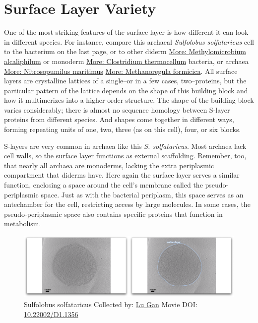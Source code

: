 \documentclass[]{tufte-book}
\begin{document}
\section{Surface Layer Variety}\label{surface-layer-variety}

One of the most striking features of the surface layer is how different
it can look in different species. For instance, compare this archaeal
\emph{Sulfolobus solfataricus} cell to the bacterium on the last page,
or to other diderm
\protect\hyperlink{Methylomicrobium_alcaliphilum}{More: Methylomicrobium
alcaliphilum} or monoderm
\protect\hyperlink{Clostridium_thermocellum}{More: Clostridium
thermocellum} bacteria, or archaea
\protect\hyperlink{Nitrosopumilus_maritimus}{More: Nitrosopumilus
maritimus} \protect\hyperlink{Methanoregula_formicica}{More:
Methanoregula formicica}. All surface layers are crystalline lattices of
a single--or in a few cases, two--proteins, but the particular pattern
of the lattice depends on the shape of this building block and how it
multimerizes into a higher-order structure. The shape of the building
block varies considerably; there is almost no sequence homology between
S-layer proteins from different species. And shapes come together in
different ways, forming repeating units of one, two, three (as on this
cell), four, or six blocks.

S-layers are very common in archaea like this \emph{S. solfataricus}.
Most archaea lack cell walls, so the surface layer functions as external
scaffolding. Remember, too, that nearly all archaea are monoderms,
lacking the extra periplasmic compartment that diderms have. Here again
the surface layer serves a similar function, enclosing a space around
the cell's membrane called the pseudo-periplasmic space. Just as with
the bacterial periplasm, this space serves as an antechamber for the
cell, restricting access by large molecules. In some cases, the
pseudo-periplasmic space also contains specific proteins that function
in metabolism.





\begin{figure}
\includegraphics{movie_stills/2_7} \caption[Sulfolobus solfataricus Collected by:
\protect\hyperlink{lu_gan}{Lu Gan} Movie DOI:
\href{https://doi.org/10.22002/D1.1356}{10.22002/D1.1356}]{Sulfolobus solfataricus Collected by:
\protect\hyperlink{lu_gan}{Lu Gan} Movie DOI:
\href{https://doi.org/10.22002/D1.1356}{10.22002/D1.1356}}\label{fig:2-7}
\end{figure}
\end{document}

